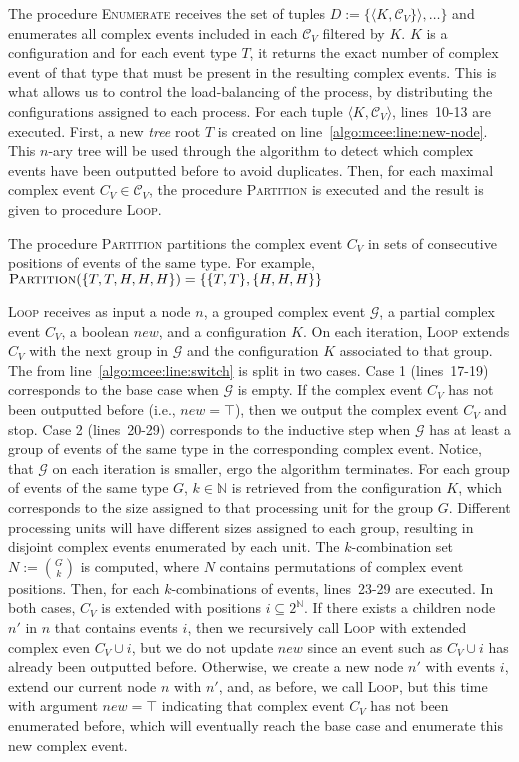 The procedure \textsc{Enumerate} receives the set of tuples $D := \{\langle K, \mathcal{C}_{V}\} \rangle, \ldots \}$ and enumerates all complex events included in each $\mathcal{C}_{V}$ filtered by $K$. $K$ is a configuration and for each event type $T$, it returns the exact number of complex event of that type that must be present in the resulting complex events. This is what allows us to control the load-balancing of the process, by distributing the configurations assigned to each process. For each tuple $\langle K, \mathcal{C}_{V} \rangle$, lines~10-13 are executed. First, a new \emph{tree} root $T$ is created on line~\ref{algo:mcee:line:new-node}. This $n$-ary tree will be used through the algorithm to detect which complex events have been outputted before to avoid duplicates. Then, for each maximal complex event $C_{V} \in \mathcal{C}_{V}$, the procedure \textsc{Partition} is executed and the result is given to procedure \textsc{Loop}.

The procedure \textsc{Partition} partitions the complex event $C_{V}$ in sets of consecutive positions of events of the same type. For example, \newline
\hspace*{60pt}$\textsc{Partition}(\{T, T, H, H, H\}) = \{\{T,T\}, \{H,H,H\}\}$

\textsc{Loop} receives as input a node $n$, a grouped complex event $\mathcal{G}$, a partial complex event $C_{V}$, a boolean $new$, and a configuration $K$. On each iteration, \textsc{Loop} extends $C_{V}$ with the next group in $\mathcal{G}$ and the configuration $K$ associated to that group. The  from line~\ref{algo:mcee:line:switch} is split in two cases. Case 1 (lines~17-19) corresponds to the base case when $\mathcal{G}$ is empty. If the complex event $C_{V}$ has not been outputted before (i.e., $new = \top$), then we output the complex event $C_{V}$ and stop. Case 2 (lines~20-29) corresponds to the inductive step when $\mathcal{G}$ has at least a group of events of the same type in the corresponding complex event. Notice, that $\mathcal{G}$ on each iteration is smaller, ergo the algorithm terminates. For each group of events of the same type $G$, $k \in \mathbb{N}$ is retrieved from the configuration $K$, which corresponds to the size assigned to that processing unit for the group $G$. Different processing units will have different sizes assigned to each group, resulting in disjoint complex events enumerated by each unit. The $k$-combination set $N := \binom{G}{k}$ is computed, where $N$ contains permutations of complex event positions. Then, for each $k$-combinations of events, lines~23-29 are executed. In both cases, $C_{V}$ is extended with positions $i \subseteq 2^{\mathbb{N}}$. If there exists a children node $n'$ in $n$ that contains events $i$, then we recursively call \textsc{Loop} with extended complex even $C_{V} \cup i$, but we do not update $new$ since an event such as $C_{V} \cup i$ has already been outputted before. Otherwise, we create a new node $n'$ with events $i$, extend our current node $n$ with $n'$, and, as before, we call \textsc{Loop}, but this time with argument $new = \top$ indicating that complex event $C_{V}$ has not been enumerated before, which will eventually reach the base case and enumerate this new complex event.
